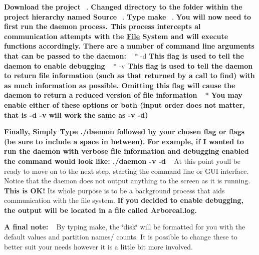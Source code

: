 \begin{DoxyEnumerate}
\item {\bfseries Download the project} ~. {\bfseries Changed directory to the folder within the project hierarchy named {\ttfamily Source}} ~. {\bfseries Type {\ttfamily make}} ~. {\bfseries You will now need to first run the daemon process. This process intercepts al communication attempts with the \mbox{\hyperlink{classFile}{File}} System and will execute functions accordingly. There are a number of command line arguments that can be passed to the daemon\+:} ~\newline
 $\ast$ {\ttfamily -\/d} {\bfseries This flag is used to tell the daemon to enable debugging} ~\newline
 $\ast$ {\ttfamily -\/v} {\bfseries This flag is used to tell the daemon to return file information (such as that returned by a call to find) with as much information as possible. Omitting this flag will cause the daemon to return a reduced version of file information} ~\newline
 $\ast$ {\bfseries You may enable either of these options or both (input order does not matter, that is {\ttfamily -\/d -\/v} will work the same as {\ttfamily -\/v -\/d})}
\item {\bfseries Finally, Simply Type {\ttfamily ./daemon} followed by your chosen flag or flags (be sure to include a space in between).} {\bfseries For example, if I wanted to run the daemon with verbose file information and debugging enabled the command would look like\+: {\ttfamily ./daemon -\/v -\/d}} ~\newline
 At this point you\textquotesingle{}ll be ready to move on to the next step, starting the command line or G\+UI interface. Notice that the daemon does not output anything to the screen as it is running. {\bfseries This is O\+K!} Its whole purpose is to be a background process that aids communication with the file system. {\bfseries If you decided to enable debugging, the output will be located in a file called {\ttfamily Arboreal.\+log}.}
\end{DoxyEnumerate}

{\bfseries A final note\+:} ~\newline
By typing make, the \char`\"{}disk\char`\"{} will be formatted for you with the default values and partition names/ counts. It is possible to change these to better suit your needs however it is a little bit more involved. ~\newline

